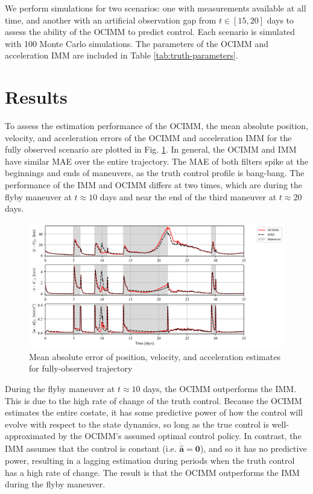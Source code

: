 \documentclass[letterpaper, preprint, paper,11pt]{AAS}	%
\begin{document}
We perform simulations for two scenarios: one with measurements available at all time, and another with an artificial observation gap from $t \in [15, 20]$ days to assess the ability of the OCIMM to predict control. Each scenario is simulated with 100 Monte Carlo simulations. The parameters of the OCIMM and acceleration IMM are included in Table \ref{tab:truth-parameters}.

\section{Results}

To assess the estimation performance of the OCIMM, the mean absolute position, velocity, and acceleration errors of the OCIMM and acceleration IMM for the fully observed scenario are plotted in Fig. \ref{fig:MAE-normal}. In general, the OCIMM and IMM have similar MAE over the entire trajectory. The MAE of both filters spike at the beginnings and ends of maneuvers, as the truth control profile is bang-bang. The performance of the IMM and OCIMM differs at two times, which are during the flyby maneuver at $t \approx 10$ days and near the end of the third maneuver at $t \approx 20$ days. 

\begin{figure}
    \centering
    \includegraphics[width=1\linewidth]{Figures/MAE_normal.png}
    \caption{Mean absolute error of position, velocity, and acceleration estimates for fully-observed trajectory}
    \label{fig:MAE-normal}
\end{figure}

During the flyby maneuver at $t \approx 10$ days, the OCIMM outperforms the IMM. This is due to the high rate of change of the truth control. Because the OCIMM estimates the entire costate, it has some predictive power of how the control will evolve with respect to the state dynamics, so long as the true control is well-approximated by the OCIMM's assumed optimal control policy. In contrast, the IMM assumes that the control is constant (i.e. $\dot{\hat{\bm{a}}} = \bm{0}$), and so it has no predictive power, resulting in a lagging estimation during periods when the truth control has a high rate of change. The result is that the OCIMM outperforms the IMM during the flyby maneuver. 
\end{document}
